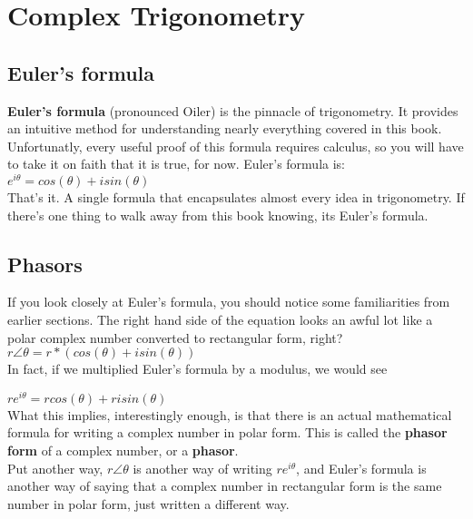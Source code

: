 \section{Complex Trigonometry}
\label{sec:complex_trigonometry}

\subsection{Euler's formula}

{\bf Euler's formula} (pronounced Oiler) is the pinnacle of trigonometry.  It provides an intuitive method for understanding nearly everything covered in this book.  Unfortunatly, every useful proof of this formula requires calculus, so you will have to take it on faith that it is true, for now.  Euler's formula is:\\

\tab$e^{i\theta} = cos(\theta) + isin(\theta)$\\

That's it.  A single formula that encapsulates almost every idea in trigonometry.  If there's one thing to walk away from this book knowing, its Euler's formula.\\

\subsection{Phasors}

If you look closely at Euler's formula, you should notice some familiarities from earlier sections.  The right hand side of the equation looks an awful lot like a polar complex number converted to rectangular form, right?\\

\tab$r\angle\theta = r*(cos(\theta) + isin(\theta))$\\

In fact, if we multiplied Euler's formula by a modulus, we would see

\tab$re^{i\theta} = rcos(\theta) + r i sin(\theta)$\\

What this implies, interestingly enough, is that there is an actual mathematical formula for writing a complex number in polar form.  This is called the {\bf phasor form} of a complex number, or a {\bf phasor}.\\

Put another way, $r\angle\theta$ is another way of writing $re^{i\theta}$, and Euler's formula is another way of saying that a complex number in rectangular form is the same number in polar form, just written a different way.\\

